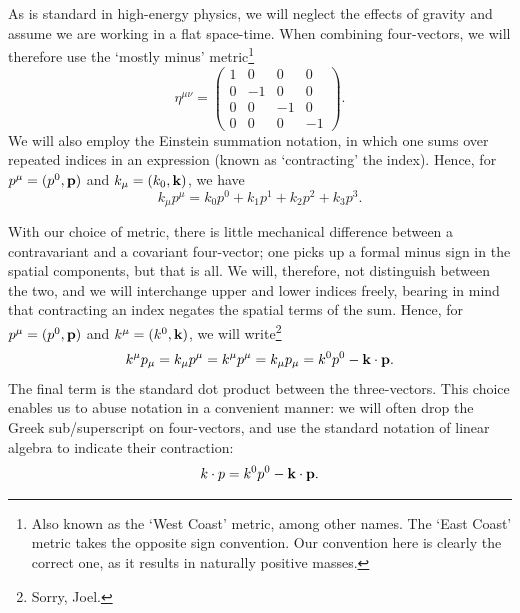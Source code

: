 \documentclass[../thesis.tex]{subfiles}
\begin{document}
	As is standard in high-energy physics, we will neglect the effects of gravity and assume we are working in a flat space-time. When combining four-vectors, we will therefore use the `mostly minus' metric\footnote{Also known as the `West Coast' metric, among other names. The `East Coast' metric takes the opposite sign convention. Our convention here is clearly the correct one, as it results in naturally positive masses.}
	\begin{equation}
		\eta^{\mu \nu} = \begin{pmatrix}
			1 & 0 & 0 & 0 \\
			0 & -1 & 0 & 0 \\
			0 & 0 & -1 & 0 \\
			0 & 0 & 0 & -1
		\end{pmatrix}.
	\end{equation}
	We will also employ the Einstein summation notation, in which one sums over repeated indices in an expression (known as `contracting' the index). Hence, for $p^\mu = (p^0, \vb{p})$ and $k_\mu = (k_0, \vb{k})$, we have
	\begin{equation}
		k_\mu p^\mu = k_0 p^0 + k_1 p^1 + k_2 p^2 + k_3 p^3.
	\end{equation}

	With our choice of metric, there is little mechanical difference between a contravariant and a covariant four-vector; one picks up a formal minus sign in the spatial components, but that is all. We will, therefore, not distinguish between the two, and we will interchange upper and lower indices freely, bearing in mind that contracting an index negates the spatial terms of the sum. Hence, for $p^\mu = (p^0, \vb{p})$ and $k^\mu = (k^0, \vb{k})$, we will write\footnote{Sorry, Joel.}
	\begin{equation}
		k^\mu p_\mu = k_\mu p^\mu = k^\mu p^\mu = k_\mu p_\mu = k^0 p^0 - \vb{k} \cdot \vb{p}.
	\end{equation}
	The final term is the standard dot product between the three-vectors. This choice enables us to abuse notation in a convenient manner: we will often drop the Greek sub/superscript on four-vectors, and use the standard notation of linear algebra to indicate their contraction:
	\begin{equation}
		k \cdot p = k^0 p^0 - \vb{k}\cdot\vb{p}.
	\end{equation}
\end{document}

